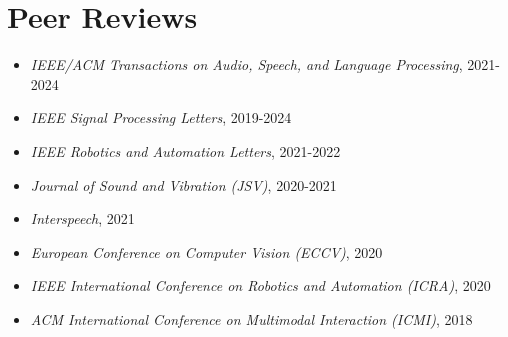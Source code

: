 \documentclass[a4paper,9pt]{extarticle} %
\begin{document}
\begin{enumerate}[label={[\arabic*]}]


\end{enumerate}


\section{Peer Reviews}

\begin{itemize}[itemsep=-.9em]
  \item \textit{IEEE/ACM Transactions on Audio, Speech, and Language Processing}, 2021-2024
  \item \textit{IEEE Signal Processing Letters}, 2019-2024
  \item \textit{IEEE Robotics and Automation Letters}, 2021-2022
  \item \textit{Journal of Sound and Vibration (JSV)}, 2020-2021
  \item \textit{Interspeech}, 2021
  \item \textit{European Conference on Computer Vision (ECCV)}, 2020
  \item \textit{IEEE International Conference on Robotics and Automation (ICRA)}, 2020
  \item \textit{ACM International Conference on Multimodal Interaction (ICMI)}, 2018
\end{itemize}
\end{document}
